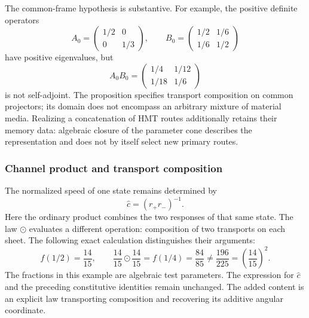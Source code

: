 The common-frame hypothesis is substantive. For example, the positive
definite operators
\[
 A_0=\begin{pmatrix}1/2&0\\0&1/3\end{pmatrix},\qquad
 B_0=\begin{pmatrix}1/2&1/6\\1/6&1/2\end{pmatrix}
\]
have positive eigenvalues, but
\[
 A_0B_0=\begin{pmatrix}1/4&1/12\\1/18&1/6\end{pmatrix}
\]
is not self-adjoint. The proposition specifies transport composition on
common projectors; its domain does not encompass an arbitrary mixture of
material media. Realizing a concatenation of HMT routes additionally
retains their memory data: algebraic closure of the parameter cone
describes the representation and does not by itself select new primary
routes.

\subsubsection{Channel product and transport composition}

The normalized speed of one state remains determined by
\[
 \widehat c=(r_+r_-)^{-1}.
\]
Here the ordinary product combines the two responses of that same state.
The law $\odot$ evaluates a different operation: composition of two
transports on each sheet. The following exact calculation distinguishes
their arguments:
\begin{equation}
 f(1/2)=\frac{14}{15},\qquad
 \frac{14}{15}\odot\frac{14}{15}=f(1/4)=\frac{84}{85}
 \ne\frac{196}{225}=\left(\frac{14}{15}\right)^2.
 \label{amp-comp-rational-example}
\end{equation}
The fractions in this example are algebraic test parameters. The
expression for $\widehat c$ and the preceding constitutive identities
remain unchanged. The added content is an explicit law transporting
composition and recovering its additive angular coordinate.
